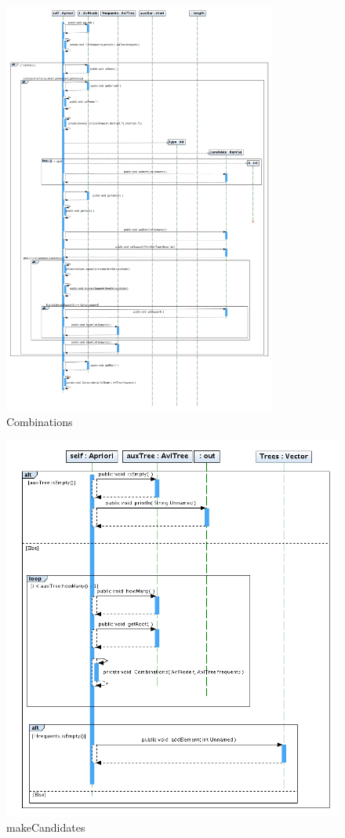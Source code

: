 \newpage
\begin{figure}
\centering
\includegraphics[width=0.8\textwidth]{imgsSecuencia/Apriori/CombinationsB.jpg}
\caption{Combinations}
\end{figure}
\newpage
\begin{figure}
\centering
\includegraphics[width=1\textwidth]{imgsSecuencia/Apriori/makeCandidates.png}
\caption{makeCandidates}
\end{figure}

